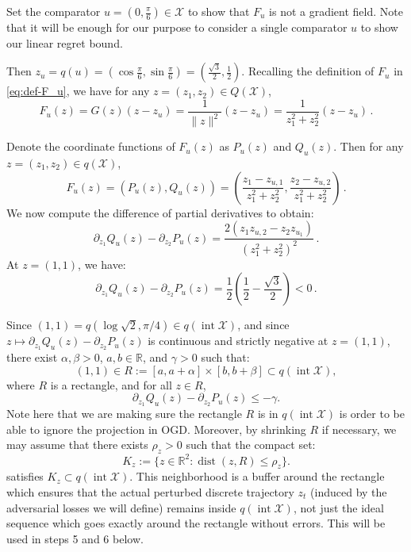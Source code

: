 \documentclass[a4paper,11pt,fullpage]{article}
\theoremstyle{plain}
\theoremstyle{definition}
\theoremstyle{plain}
\begin{document}
Set the comparator $u = (0, \frac{\pi}{6}) \in \mathcal{X}$ to show that $F_u$ is not a gradient field. Note that it will be enough for our purpose to consider a single comparator $u$ to show our linear regret bound. 

Then $z_u = q(u) = (\cos \frac{\pi}{6},\sin  \frac{\pi}{6}) = (\frac{\sqrt{3}}{2}, \frac 12)$. Recalling the definition of $F_u$ in \eqref{eq:def-F_u}, we have for any $z = (z_1, z_2) \in Q(\mathcal{X})$, 
\begin{equation*}
F_u(z) = G(z) (z - z_u) = \frac{1}{\|z\|^2} (z-z_u) = \frac{1}{z_1^2 + z_2^2} (z-z_u)\,.
\end{equation*}

Denote the coordinate functions of $F_u(z)$ as $P_u(z)$ and $Q_u(z)$. Then for any $z = (z_1, z_2) \in q(\mathcal{X})$, 
\begin{equation*}
F_u(z) = (P_u(z), Q_u(z)) = \left( \frac{z_1 - z_{u,1}}{z_1^2 + z_2^2}, \frac{z_2 - z_{u,2}}{z_1^2 + z_2^2}  \right)\,.
\end{equation*}
We now compute the difference of partial derivatives to obtain: 
\begin{equation*}
\partial_{z_1} Q_u(z) - \partial_{z_2} P_u(z) = \frac{2(z_1 z_{u,2} - z_2 z_{u_1})}{(z_1^2 + z_2^2)^2}\,.
\end{equation*}
At $z = (1, 1)$, we have: 
\begin{equation*}
\partial_{z_1} Q_u(z) - \partial_{z_2} P_u(z) = \frac 12 \left( \frac 12 - \frac{\sqrt{3}}{2}\right) < 0\,.
\end{equation*}

Since
$(1,1)=q(\log\sqrt 2,\pi/4)\in q(\operatorname{int}\mathcal X)$,
and since
$z\mapsto \partial_{z_1}Q_u(z)-\partial_{z_2}P_u(z)$
is continuous and strictly negative at $z=(1,1)$, there exist
\(\alpha,\beta>0\), \(a,b\in\mathbb R\), and \(\gamma>0\) such that: 
\begin{equation}
\label{eq:rec-R}
(1,1) \in R:=[a,a+\alpha]\times[b,b+\beta] \subset q(\operatorname{int}\mathcal X),
\end{equation}
where $R$ is a rectangle, and for all $z\in R$,
\begin{equation}
\label{eq:cross-partial-diff-neg}
\partial_{z_1}Q_u(z)-\partial_{z_2}P_u(z)\le -\gamma .
\end{equation}
Note here that we are making sure the rectangle $R$ is in $q(\operatorname{int}\mathcal X)$ is order to be able to ignore the projection in OGD. 
Moreover, by shrinking $R$ if necessary, we may assume that there exists
$\rho_z>0$ such that the compact set: 
\begin{equation}
\label{eq:def-Kz}
K_z:=\{z\in\mathbb R^2:\operatorname{dist}(z,R)\le \rho_z\}.
\end{equation}
satisfies $K_z \subset q(\operatorname{int}\mathcal X)$. 
This neighborhood is a buffer around the rectangle which ensures that the actual perturbed discrete trajectory $z_t$ (induced by the adversarial losses we will define) remains inside $q(\operatorname{int}\mathcal X)$, not just the ideal sequence which goes exactly around the rectangle without errors. This will be used  in steps 5 and 6 below.  
\end{document}
